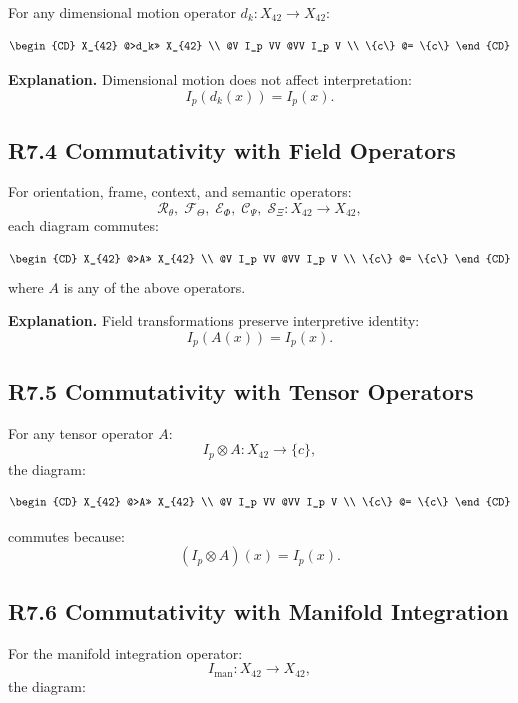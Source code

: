 For any dimensional motion operator $d_k : X_{42} \to X_{42}$:

\[
\begin{CD}
X_{42} @>d_k>> X_{42} \\
@V I_p VV @VV I_p V \\
\{c\} @= \{c\}
\end{CD}
\]

\textbf{Explanation.}  
Dimensional motion does not affect interpretation:
\[
I_p(d_k(x)) = I_p(x).
\]

\subsection*{R7.4 Commutativity with Field Operators}

For orientation, frame, context, and semantic operators:
\[
\mathcal{R}_{\theta},\;
\mathcal{F}_{\Theta},\;
\mathcal{E}_{\Phi},\;
\mathcal{C}_{\Psi},\;
\mathcal{S}_{\Xi} : X_{42} \to X_{42},
\]
each diagram commutes:

\[
\begin{CD}
X_{42} @>A>> X_{42} \\
@V I_p VV @VV I_p V \\
\{c\} @= \{c\}
\end{CD}
\]
where $A$ is any of the above operators.

\textbf{Explanation.}  
Field transformations preserve interpretive identity:
\[
I_p(A(x)) = I_p(x).
\]

\subsection*{R7.5 Commutativity with Tensor Operators}

For any tensor operator $A$:
\[
I_p \otimes A : X_{42} \to \{c\},
\]
the diagram:

\[
\begin{CD}
X_{42} @>A>> X_{42} \\
@V I_p VV @VV I_p V \\
\{c\} @= \{c\}
\end{CD}
\]

commutes because:
\[
(I_p \otimes A)(x) = I_p(x).
\]

\subsection*{R7.6 Commutativity with Manifold Integration}

For the manifold integration operator:
\[
I_{\mathrm{man}} : X_{42} \to X_{42},
\]
the diagram:

